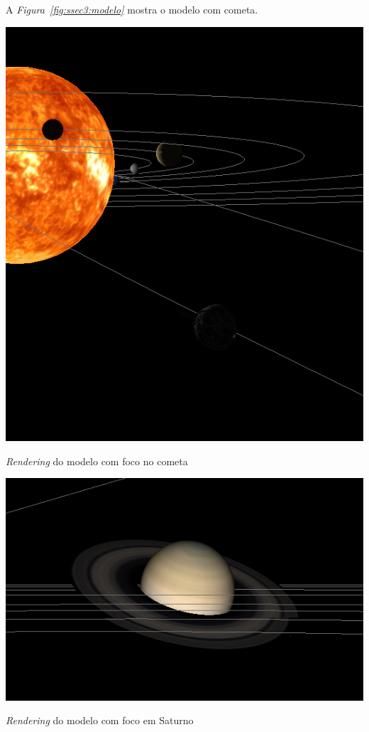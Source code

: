 A \emph{Figura~\ref{fig:ssec3:modelo}} mostra o modelo com cometa. 

\begin{center}
 	
 	\includegraphics[width=\textwidth,height=\textheight,keepaspectratio]{resources/pormenorCometa.png}
 	\captionsetup{type=figure, width=0.8\linewidth}
	\caption{\textit{Rendering} do modelo com foco no cometa}
\label{fig:ssec3:modelo} 
\end{center}


\begin{center}
 	
 	\includegraphics[width=\textwidth,height=\textheight,keepaspectratio]{resources/pormenorSaturno.png}
 	\captionsetup{type=figure, width=0.8\linewidth}
	\caption{\textit{Rendering} do modelo com foco em Saturno}
\label{fig:ssec3:modelo2} 
\end{center}



